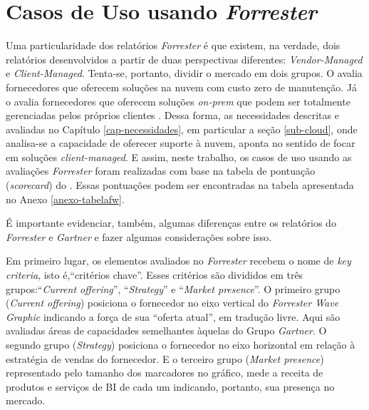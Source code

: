 








\chapter{Casos de Uso usando \emph{Forrester}}
\label{cap-casos-forrester}


Uma particularidade dos relatórios \emph{Forrester} é que existem, na verdade, dois relatórios desenvolvidos a partir de duas perspectivas diferentes: \emph{Vendor-Managed} e \emph{Client-Managed}. Tenta-se, portanto, dividir o mercado em dois grupos. O \relFVM  \xspace \cite{forrester:vendormanaged} avalia fornecedores que oferecem soluções na nuvem com custo zero de manutenção. Já o \relFCM \xspace \cite{forrester:clientmanaged} avalia fornecedores que oferecem soluções \emph{on-prem} que podem ser totalmente gerenciadas pelos próprios clientes \cite{forrester:vendorclient}. Dessa forma, as necessidades descritas e avaliadas no Capítulo \ref{cap-necessidades}, em particular a seção \ref{sub-cloud}, onde analisa-se a capacidade de oferecer suporte à nuvem, aponta no sentido de focar em soluções \emph{client-managed}. E assim, neste trabalho, os casos de uso usando as avaliações \emph{Forrester} foram realizadas com base na tabela de pontuação (\emph{scorecard}) do \relatorioFCM. Essas pontuações podem ser encontradas na tabela apresentada no Anexo \ref{anexo-tabelafw}. 

É importante evidenciar, também, algumas diferenças entre os relatórios do \emph{Forrester} e \emph{Gartner} e fazer algumas considerações sobre isso.

Em primeiro lugar, os elementos avaliados no \emph{Forrester} recebem o nome de \emph{key criteria}, isto é,``critérios chave''. Esses critérios são divididos em três grupos:``\emph{Current offering}'', ``\emph{Strategy}'' e ``\emph{Market presence}''. O primeiro grupo (\emph{Current offering}) posiciona o fornecedor no eixo vertical do \emph{Forrester Wave Graphic} indicando a força de sua ``oferta atual'', em tradução livre. Aqui são avaliadas áreas de capacidades semelhantes àquelas do Grupo \emph{Gartner}.
O segundo grupo (\emph{Strategy}) posiciona o fornecedor no eixo horizontal em relação à estratégia de vendas do fornecedor. E o terceiro grupo (\emph{Market presence}) representado pelo tamanho dos marcadores no gráfico, mede a receita de produtos e serviços de BI de cada um indicando, portanto, sua presença no mercado.  

